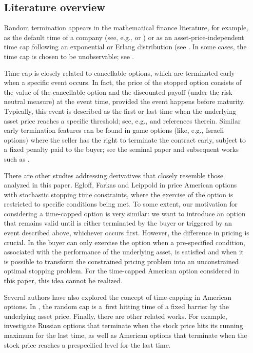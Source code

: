 \documentclass[10pt,a4paper]{amsart}
\begin{document}
	\subsection{Literature overview}
	Random termination appears in the mathematical finance literature, for example, as the default time of a company (see, e.g., \cite[p. 27]{BieleckiRutkowski} or \cite{Mladen}) or
	as an asset-price-independent time cap following an exponential or Erlang distribution (see \cite{carr, Florin}. In some cases, the time cap is chosen to be unobservable; see \cite{gapeev1}.
	
	Time-cap is closely related to cancellable options, which are terminated early when a specific event occurs. In fact, the price of the stopped option consists of the value of the cancellable option and the discounted payoff (under the risk-neutral measure) at the event time, provided the event happens before maturity.
	Typically, this event is described as the first or last time when the underlying asset price
	reaches a specific threshold; see, e.g., \cite{1st_pass, algo} and references therein.
	Similar early termination features can be found in game options (like, e.g., Israeli options) where the seller has the right to terminate the contract early, subject to a fixed penalty paid to the buyer; see the seminal paper \cite{kifer}
	and subsequent works such as \cite{meyer, Zaevski2, Zaevski2b}.
	
	There are other studies addressing derivatives that closely resemble those analyzed in this paper.
	Egloff, Farkas and Leippold in \cite{time_constraints} price American options with
	stochastic stopping time constraints, where the exercise of the option is restricted to specific conditions being met.
	To some extent, our motivation for considering a time-capped option is very similar:
	we want to introduce an option that remains valid until is either terminated by the buyer or triggered by an event described above, whichever occurs first.
	However, the difference in pricing is crucial. In \cite{time_constraints} the buyer can only exercise the option
when a pre-specified condition, associated with the performance of the underlying asset, is satisfied and when it is possible to transform the constrained pricing problem into an unconstrained optimal stopping problem.
	For the time-capped American option considered in this paper, this idea cannot be realized.
	
	
	Several authors have also explored the concept of time-capping in American options.
	In \cite{trabelsi}, the random cap is a~first hitting time of a fixed barrier by
	the underlying asset price. Finally, there are other related works.
	For example, \cite{russian, random_put, ott} investigate Russian options that terminate when the stock price hits its running maximum for the last time, as well as American options that terminate when the stock price reaches a prespecified level for the last time.
	
\end{document}
